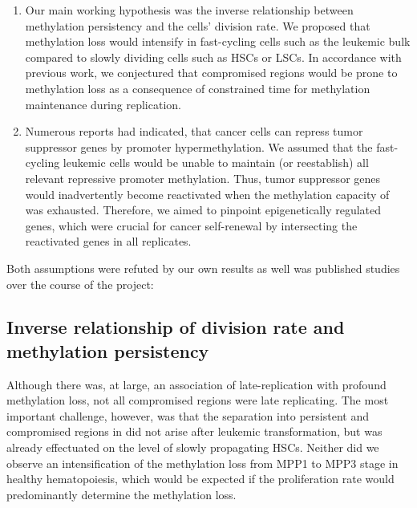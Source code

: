 \begin{enumerate}
	\item Our main working hypothesis was the inverse relationship between methylation persistency and the cells' division rate. We proposed that methylation loss would intensify in fast-cycling cells such as the leukemic bulk compared to slowly dividing cells such as HSCs or LSCs. In accordance with previous work\cite{Aran2011}, we conjectured that compromised regions would be prone to methylation loss as a consequence of constrained time for methylation maintenance during replication. 
	\item Numerous reports had indicated, that cancer cells can repress tumor suppressor genes by promoter hypermethylation. We assumed that the fast-cycling \dnmtchip leukemic cells would be unable to maintain (or reestablish) all relevant repressive promoter methylation. Thus, tumor suppressor genes would inadvertently become reactivated when the methylation capacity of \dnmtchip was exhausted.  Therefore, we aimed to pinpoint epigenetically regulated genes, which were crucial for cancer self-renewal by intersecting the reactivated genes in all replicates. 
\end{enumerate}

Both assumptions were refuted by our own results as well was published studies over the course of the project:

\subsection{Inverse relationship of division rate and methylation persistency}
\label{chap:d:methylation:shaping:inverse}

Although there was, at large, an association of late-replication with profound methylation loss, not all compromised regions were late replicating. The most important challenge, however, was that the separation into persistent and compromised regions in \dnmtchip did not arise after leukemic transformation, but was already effectuated on the level of slowly propagating HSCs. Neither did we observe an intensification of the methylation loss from MPP1 to MPP3 stage in healthy \dnmtchip hematopoiesis, which would be expected if the proliferation rate would predominantly determine the methylation loss.

